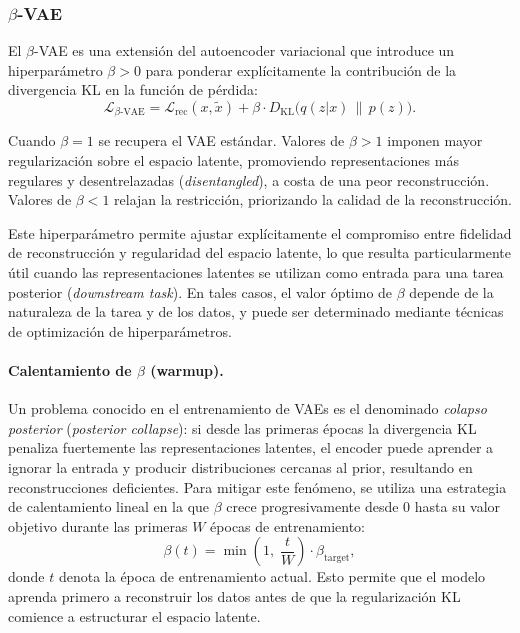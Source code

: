 \subsubsection{$\beta$-VAE}
\label{sec:beta_vae_theory}

El $\beta$-VAE \cite{higgins2017beta} es una extensión del autoencoder variacional que introduce un hiperparámetro $\beta > 0$ para ponderar explícitamente la contribución de la divergencia KL en la función de pérdida:
\[
\mathcal{L}_{\beta\text{-VAE}} = \mathcal{L}_{\text{rec}}(x, \tilde{x}) + \beta \cdot D_{\text{KL}}\big(q(z|x) \,\|\, p(z)\big).
\]

Cuando $\beta = 1$ se recupera el VAE estándar. Valores de $\beta > 1$ imponen mayor regularización sobre el espacio latente, promoviendo representaciones más regulares y desentrelazadas (\textit{disentangled}), a costa de una peor reconstrucción. Valores de $\beta < 1$ relajan la restricción, priorizando la calidad de la reconstrucción.

Este hiperparámetro permite ajustar explícitamente el compromiso entre fidelidad de reconstrucción y regularidad del espacio latente, lo que resulta particularmente útil cuando las representaciones latentes se utilizan como entrada para una tarea posterior (\textit{downstream task}). En tales casos, el valor óptimo de $\beta$ depende de la naturaleza de la tarea y de los datos, y puede ser determinado mediante técnicas de optimización de hiperparámetros.

\paragraph{Calentamiento de $\beta$ (warmup).}
Un problema conocido en el entrenamiento de VAEs es el denominado \textit{colapso posterior} (\textit{posterior collapse}): si desde las primeras épocas la divergencia KL penaliza fuertemente las representaciones latentes, el encoder puede aprender a ignorar la entrada y producir distribuciones cercanas al prior, resultando en reconstrucciones deficientes. Para mitigar este fenómeno, se utiliza una estrategia de calentamiento lineal en la que $\beta$ crece progresivamente desde 0 hasta su valor objetivo durante las primeras $W$ épocas de entrenamiento:
\[
\beta(t) = \min\!\left(1, \; \frac{t}{W}\right) \cdot \beta_{\text{target}},
\]
donde $t$ denota la época de entrenamiento actual. Esto permite que el modelo aprenda primero a reconstruir los datos antes de que la regularización KL comience a estructurar el espacio latente.

